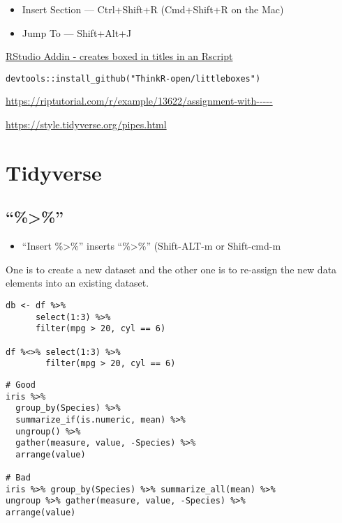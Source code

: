 \documentclass[]{book}
\providecommand{\tightlist}{%
  \setlength{\itemsep}{0pt}\setlength{\parskip}{0pt}}
\begin{document}
\begin{itemize}
\tightlist
\item
  Insert Section --- Ctrl+Shift+R (Cmd+Shift+R on the Mac)
\item
  Jump To --- Shift+Alt+J
\end{itemize}

\href{https://github.com/ThinkR-open/littleboxes}{RStudio Addin - creates boxed in titles in an Rscript}

\begin{verbatim}
devtools::install_github("ThinkR-open/littleboxes")
\end{verbatim}

\url{https://riptutorial.com/r/example/13622/assignment-with-----}

\url{https://style.tidyverse.org/pipes.html}

\hypertarget{tidyverse}{%
\section{Tidyverse}\label{tidyverse}}

\hypertarget{section}{%
\subsection{``\%\textgreater{}\%''}\label{section}}

\begin{itemize}
\tightlist
\item
  ``Insert \%\textgreater{}\%'' inserts ``\%\textgreater{}\%'' (Shift-ALT-m or Shift-cmd-m
\end{itemize}

One is to create a new dataset and the other one is to re-assign the new data elements into an existing dataset.

\begin{verbatim}
db <- df %>% 
      select(1:3) %>% 
      filter(mpg > 20, cyl == 6)

df %<>% select(1:3) %>%
        filter(mpg > 20, cyl == 6)
\end{verbatim}

\begin{verbatim}
# Good
iris %>%
  group_by(Species) %>%
  summarize_if(is.numeric, mean) %>%
  ungroup() %>%
  gather(measure, value, -Species) %>%
  arrange(value)

# Bad
iris %>% group_by(Species) %>% summarize_all(mean) %>%
ungroup %>% gather(measure, value, -Species) %>%
arrange(value)
\end{verbatim}
\end{document}
